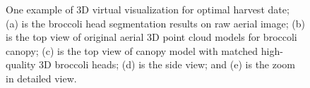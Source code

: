 \begin{figure}[htb!]
  \begin{center}
  \end{center}
  \caption[One example of 3D virtual visualization for optimal harvest date]{
    One example of 3D virtual visualization for optimal harvest date; (a) is the broccoli head segmentation results on raw aerial image; (b) is the top view of original aerial 3D point cloud models for broccoli canopy; (c) is the top view of canopy model with matched high-quality 3D broccoli heads; (d) is the side view; and (e) is the zoom in detailed view.
  }
  \label{fig:xrs5}
\end{figure}